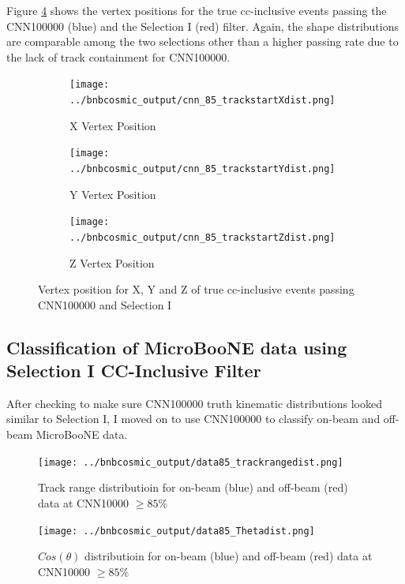 Figure \ref{fig:vertex} shows the vertex positions for the true cc-inclusive events passing the CNN100000 (blue) and the Selection I (red) filter. Again, the shape distributions are comparable among the two selections other than a higher passing rate due to the lack of track containment for CNN100000.  
\begin{figure}[htp!]
\centering
	\begin{subfigure}[b]{.55\textwidth}
	\centering
		\texttt{[image: ../bnbcosmic\_output/cnn\_85\_trackstartXdist.png]}
		\caption{X Vertex Position} 
		\label{fig:cnn85vertexX}
	\end{subfigure}
	\quad
	\begin{subfigure}[b]{.55\textwidth}
	\centering
		\texttt{[image: ../bnbcosmic\_output/cnn\_85\_trackstartYdist.png]}
		\caption{Y Vertex Position} 
		\label{fig:cnn85vertexY}
	\end{subfigure}
	\quad
	\begin{subfigure}[b]{.55\textwidth}
	\centering
		\texttt{[image: ../bnbcosmic\_output/cnn\_85\_trackstartZdist.png]}
		\caption{Z Vertex Position} 
		\label{fig:cnn85vertexZ}
	\end{subfigure}
\caption{Vertex position for X, Y and Z of true cc-inclusive events passing CNN100000 and Selection I}
\label{fig:vertex}
\end{figure}


\subsection{Classification of MicroBooNE data using Selection I CC-Inclusive Filter}
After checking to make sure CNN100000 truth kinematic distributions looked similar to Selection I, I moved on to use CNN100000 to classify on-beam and off-beam MicroBooNE data. 

\begin{figure}[htp!]
\centering
\texttt{[image: ../bnbcosmic\_output/data85\_trackrangedist.png]}
\caption{Track range distributioin for on-beam (blue) and off-beam (red) data at CNN10000 $\geq 85\%$} 
\label{fig:datatrackrange}
\end{figure}

\begin{figure}[htp!]
\centering
\texttt{[image: ../bnbcosmic\_output/data85\_Thetadist.png]}
\caption{$Cos(\theta)$ distributioin for on-beam (blue) and off-beam (red) data at CNN10000 $\geq 85\%$} 
\label{fig:datatheta}
\end{figure}

